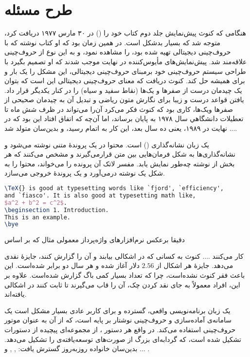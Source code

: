 \section{طرح مسئله}
هنگامی که کنوث پیش‌نمایش جلد دوم کتاب خود را
()
در ۳۰ مارس ۱۹۷۷ دریافت کرد، متوجه شد که بسیار بدشکل است. در همین زمان بود که او کتاب
نوشته
که با حروف‌چینی دیجیتالی تهیه شده بود، را مشاهده نمود، و به این نوع از حروف‌چینی علاقه‌مند شد. پیش‌نمایش‌های مأیوس‌کننده در نهایت موجب شدند که او تصمیم بگیرد با طراحی سیستم حروف‌چینی خود برمبنای حروف‌چینی دیجیتالی، این مشکل را یک بار و برای همیشه حل کند. کنوث دریافت که معنای حروف‌چینی دیجیتالی این است که بتوان یک چیدمان درست از صفرها و یک‌ها (نقاط سفید و سیاه) را در کنار یکدیگر قرار داد. یافتن قواعد درست و زیبا برای نگارش متون ریاضی و تبدیل آن به چیدمان صحیحی از صفرها ویک‌ها، کاری بود که کنوث فکر می‌کرد آن‌را می‌تواند در ظرف شش ماه تا تعطيلات دانشگاهي سال ۱۹۷۸ به پایان برساند، اما آن‌چه که اتفاق افتاد این بود که در نهایت در ۱۹۸۹، یعنی ده سال بعد، این کار به اتمام رسید، و بدین‌سان 
\lr{\TeX{}}
متولد شد .... 

\lr{\TeX{}}
یک زبان نشانه‌گذاری
()
است.  محتوا در یک پروندهٔ متنی نوشته می‌شود و نشانه‌گذاری‌ها به شکل فرمان‌هایی بین متن قرارمی‌گیرند و مشخص می‌کنند که هر بخش از نوشته چه‌طور نمایش یابد. مفسر لاتک آن پرونده را می‌خواند، محتوا را به شکل یک نوشته درمی‌آورد و یک پروندهٔ خروجی می‌سازد. 
\begin{lstlisting}[language=TeX, numbers=none]
% Plain TeX for a 1 page document
\TeX{} is good at typesetting words like `fjord', `efficiency',
and `fiasco'. It is also good at typesetting math like,
$a^2 + b^2 = c^2$.
\beginsection 1. Introduction.
This is an example.
\bye
\end{lstlisting}
دقیقا برعکس نرم‌افزارهای واژه‌پرداز معمولی مثال 
که بر اساس
\begin{center}
\end{center}
کار می‌کنند .... کنوث به کسانی که در 
\lr{\TeX{}}
 اشکالی بیابند و آن را گزارش کنند، جایزهٔ نقدی می‌دهد. جایزهٔ هر اشکال از 
$2.56$
 دلار آغاز شده و هر سال دو برابر شده‌است. این باعث فقر کنوث نشده‌است، چرا که تعداد بسیار کمی باگ گزارش شده‌است. علاوه بر این، افراد معمولاً به جای نقد کردن چک، آن را قاب می‌گیرند تا ثابت کنند در 
\lr{\TeX{}}
 اشکالی یافته‌اند.

\lr{\TeX{}}
یک زبان برنامه‌نویسی واقعی، گسترده و برای کاربر عادی بسیار مشکل است 
\lr{\LaTeX}
یک سامانه‌ی آماده‌سازی و حروف‌چینی نوشتار بر پایه
\lr{\TeX{}}
است، که از آن به عنوان موتور حروف‌چینی استفاده می‌کند.  در واقع هر دستور \lr{\LaTeX}، از مجموعه‌ای پیچیده از دستورات \lr{\TeX{}} تشکیل شده است، که گردابه‌ای بزرگ از صورت‌های توسعه‌یافته‌ی \lr{\TeX{}} را تشکیل می‌دهد. بدین‌سان خانواده 
\lr{\TeX{}}
روزبه‌روز گسترش یافت:
, ,  و ... .

